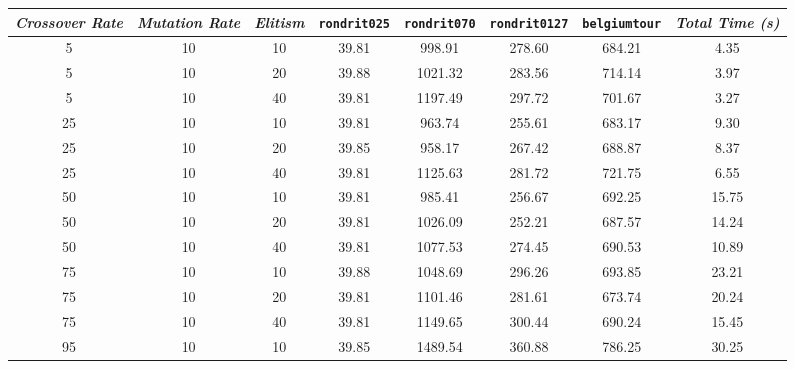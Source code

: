 \begin{table}[h]
\centering
\footnotesize
{\renewcommand{\arraystretch}{1}}
\begin{tabular}{ccc|c|c|c|c|c}
\textit{Crossover Rate} & \textit{Mutation Rate} & \textit{Elitism} & \texttt{rondrit025} & \texttt{rondrit070} & \texttt{rondrit0127} & \texttt{belgiumtour} & \textit{Total Time (s)} \\\hline
5 & 10 & 10 & \cellcolor{gray!50}39.81 & \cellcolor{gray!5}998.91 & \cellcolor{gray!1}278.60 & \cellcolor{gray!43}684.21 & 4.35\\
5 & 10 & 20 & \cellcolor{gray!50}39.88 & \cellcolor{gray!1}1021.32 & \cellcolor{gray!1}283.56 & \cellcolor{gray!34}714.14 & 3.97\\
5 & 10 & 40 & \cellcolor{gray!50}39.81 & \cellcolor{gray!1}1197.49 & \cellcolor{gray!1}297.72 & \cellcolor{gray!38}701.67 & 3.27\\
25 & 10 & 10 & \cellcolor{gray!50}39.81 & \cellcolor{gray!11}963.74 & \cellcolor{gray!1}255.61 & \cellcolor{gray!43}683.17 & 9.30\\
25 & 10 & 20 & \cellcolor{gray!50}39.85 & \cellcolor{gray!12}958.17 & \cellcolor{gray!1}267.42 & \cellcolor{gray!42}688.87 & 8.37\\
25 & 10 & 40 & \cellcolor{gray!50}39.81 & \cellcolor{gray!1}1125.63 & \cellcolor{gray!1}281.72 & \cellcolor{gray!31}721.75 & 6.55\\
50 & 10 & 10 & \cellcolor{gray!50}39.81 & \cellcolor{gray!7}985.41 & \cellcolor{gray!1}256.67 & \cellcolor{gray!41}692.25 & 15.75\\
50 & 10 & 20 & \cellcolor{gray!50}39.81 & \cellcolor{gray!1}1026.09 & \cellcolor{gray!1}252.21 & \cellcolor{gray!42}687.57 & 14.24\\
50 & 10 & 40 & \cellcolor{gray!50}39.81 & \cellcolor{gray!1}1077.53 & \cellcolor{gray!1}274.45 & \cellcolor{gray!41}690.53 & 10.89\\
75 & 10 & 10 & \cellcolor{gray!50}39.88 & \cellcolor{gray!1}1048.69 & \cellcolor{gray!1}296.26 & \cellcolor{gray!40}693.85 & 23.21\\
75 & 10 & 20 & \cellcolor{gray!50}39.81 & \cellcolor{gray!1}1101.46 & \cellcolor{gray!1}281.61 & \cellcolor{gray!46}673.74 & 20.24\\
75 & 10 & 40 & \cellcolor{gray!50}39.81 & \cellcolor{gray!1}1149.65 & \cellcolor{gray!1}300.44 & \cellcolor{gray!41}690.24 & 15.45\\
95 & 10 & 10 & \cellcolor{gray!50}39.85 & \cellcolor{gray!1}1489.54 & \cellcolor{gray!1}360.88 & \cellcolor{gray!12}786.25 & 30.25\\

\end{tabular}
\end{table}
